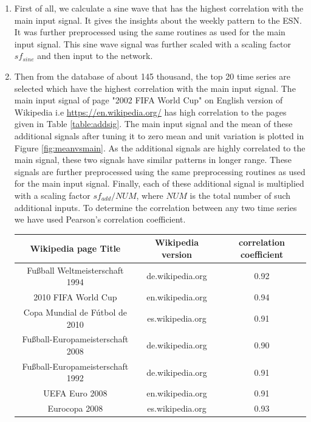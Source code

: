  \begin{enumerate}
	 \item First of all, we calculate a sine wave that has the highest correlation with the main input signal. It gives the insights about the weekly pattern to the ESN.  It was further preprocessed using the same routines as used for the main input signal. This sine wave signal was further scaled with a scaling factor $sf_{sine}$ and then input to the network.
	 \item Then from the database of about 145 thousand, the top 20 time series are selected which have the highest correlation with the main input signal. The main input signal of page "2002 FIFA World Cup" on English version of Wikipedia i.e \url{https://en.wikipedia.org/} has high correlation to the pages given in Table \ref{table:addsig}. The main input signal and the mean of these additional signals after tuning it to zero mean and unit variation is plotted in Figure \ref{fig:meanvsmain}. As the additional signals are highly correlated to the main signal, these two signals have similar patterns in longer range.  These signals are further preprocessed using the same preprocessing routines as used for the main input signal. Finally, each of these additional signal is multiplied with a scaling factor $sf_{add}/NUM$, where $NUM$ is the total number of such additional inputs. To determine the correlation between any two time series we have used Pearson's correlation coefficient.\\
 	\begin{center}
 	 \label{table:addsig} 
 	\begin{tabular}{|c|c|c|} \hline
 		\textbf{Wikipedia page Title} & \textbf{Wikipedia version} & \textbf{correlation coefficient} \\ \hline
		Fußball Weltmeisterschaft 1994 & de.wikipedia.org & 0.92 \\ \hline
		2010 FIFA World Cup & en.wikipedia.org & 0.94 \\ \hline
		Copa Mundial de Fútbol de 2010 & es.wikipedia.org & 0.91 \\ \hline
		Fußball-Europameisterschaft 2008 & de.wikipedia.org & 0.90 \\ \hline
		Fußball-Europameisterschaft 1992 & de.wikipedia.org & 0.91 \\ \hline
		UEFA Euro 2008 & en.wikipedia.org &  0.91 \\ \hline
		Eurocopa 2008 & es.wikipedia.org & 0.93 \\ \hline

\end{tabular}
\end{center}
\end{enumerate}
